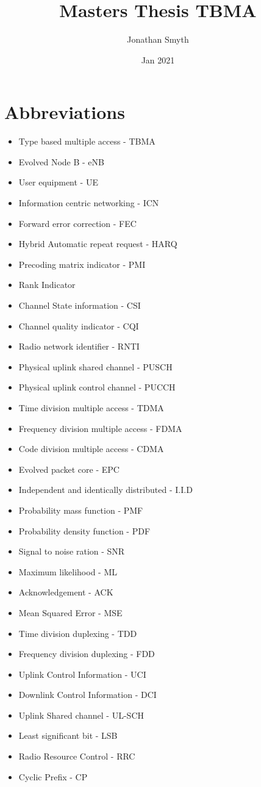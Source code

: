 \documentclass{article}
\title{Masters Thesis TBMA}
\author{Jonathan Smyth}
\date{Jan 2021}
\begin{document}
\maketitle
\tableofcontents

\section{Abbreviations}
\begin{itemize}
\item Type based multiple access - TBMA
\item Evolved Node B - eNB
\item User equipment - UE
\item Information centric networking - ICN
\item Forward error correction - FEC
\item Hybrid Automatic repeat request - HARQ
\item Precoding matrix indicator - PMI 
\item Rank Indicator 
\item Channel State information - CSI 
\item Channel quality indicator - CQI 
\item Radio network identifier - RNTI
\item Physical uplink shared channel - PUSCH
\item Physical uplink control channel - PUCCH
\item Time division multiple access - TDMA 
\item Frequency division multiple access - FDMA
\item Code division multiple access - CDMA
\item Evolved packet core - EPC
\item Independent and identically distributed - I.I.D
\item Probability mass function - PMF
\item Probability density function - PDF
\item Signal to noise ration - SNR 
\item Maximum likelihood - ML
\item Acknowledgement - ACK
\item Mean Squared Error - MSE 
\item Time division duplexing - TDD
\item Frequency division duplexing - FDD
\item Uplink Control Information - UCI
\item Downlink Control Information - DCI
\item Uplink Shared channel - UL-SCH 
\item Least significant bit - LSB
\item Radio Resource Control - RRC
\item Cyclic Prefix - CP
\end{itemize} 
\end{document}
